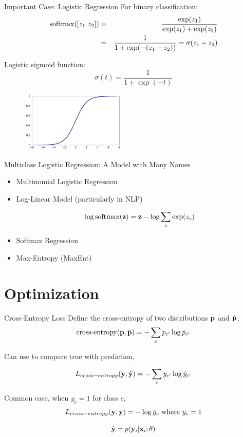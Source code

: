 \documentclass{beamer}
\begin{document}
\begin{frame}{Important Case: Logistic Regression}
  For binary classification:
  \begin{eqnarray*}
   \softmax([z_1\ z_2]) &=& \frac{\exp(z_1)}{\exp(z_1) + \exp(z_2)} \\
 &=& \frac{1}{1 + \exp(-(z_1-z_2))} = \sigma(z_1 -z_2)
  \end{eqnarray*}

  Logistic sigmoid function:
  \[\sigma(t) = \frac{1}{1 + \exp(-t)} \]
  \begin{figure}
    \centering
    \includegraphics[width=5cm]{sigmoid}
  \end{figure}
\end{frame}

\begin{frame}{Multiclass Logistic Regression: A Model with Many Names}
  \begin{itemize}
  \item  Multinomial Logistic Regression


  \item Log-Linear Model (particularly in NLP)
    
    \[\log \softmax(\boldz) = \boldz - \log \sum_{c} \exp(z_c)  \]

    
  \item Softmax Regression
    
    
  \item Max-Entropy (MaxEnt)
    
    
  \end{itemize}
\end{frame}


\section{Optimization}


\begin{frame}{Cross-Entropy Loss}
  Define the cross-entropy of two distributions $\mathbf{p}$ and $\hat{\mathbf{p}}$, 
  \[ \textrm{cross-entropy}(\mathbf{p}, \hat{\mathbf{p}})= -\sum_{c}p_{c'} \log \hat{p}_{c'}  \]

  Can use to compare true with prediction,

  \[L_{cross-entropy}(\mathbf{y}, \hat{\mathbf{y}}) = - \sum_{c} y_{c'} \log \hat{y}_{c'} \]

  Common case, when $y_c = 1$ for class $c$,
  \[L_{cross-entropy}(\mathbf{y}, \hat{\mathbf{y}}) = - \log \hat{y}_c \mathrm{\ where\ }y_c = 1 \]

  

  \[ \hat{\mathbf{y}} = p(\mathbf{y}_i | \mathbf{x}_i; \theta) \]



\end{frame}
\end{document}
